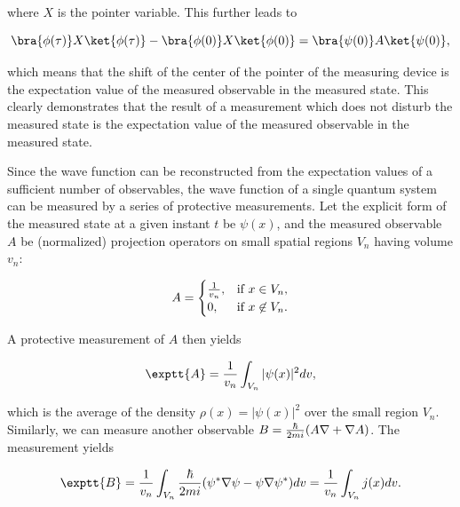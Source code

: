 \noindent where $X$ is the pointer variable. This further leads to

\begin{equation}
\bra{\phi(\tau)}X\ket{\phi(\tau)}- \bra{\phi(0)}X\ket{\phi(0)}= \bra{\psi(0)}A\ket{\psi(0)},
\end{equation}

\noindent which means that the shift of the center of the pointer of the measuring device is the expectation value of the measured observable in the measured state. This clearly demonstrates  that the result of a measurement which does not disturb the measured state is the expectation value of the measured observable in the measured state.

Since the wave function can be reconstructed from the expectation values of a sufficient number of observables, the wave function of a single quantum system can be measured by a series of protective measurements. Let the explicit form of the measured state at a given instant $t$ be $\psi(x)$, and the measured observable $A$ be (normalized) projection operators on small spatial regions $V_n$ having volume $v_n$:

\begin{equation}
A= 
\begin{cases} 
{1\over{v_n}},& \text{if $x \in V_n$,}
\\
0,&\text{if $x \not\in V_n$.} 
\end{cases}
\label{OA}
\end{equation}

\noindent  A protective measurement of $A$ then yields 

\begin{equation}
\exptt{A} = {1\over {v_n}} \int_{V_n}|\psi(x)|^2 dv,
\end{equation}

\noindent  which is the average of the density $\rho(x) = |\psi(x)|^2$ over the small region $V_n$. Similarly, we can measure another observable $B ={\hbar \over{2mi}} (A\nabla + \nabla A)$. The measurement yields

\begin{equation}
\exptt{B} ={1\over {v_n}} \int_{V_n}{\hbar \over{2mi}}(\psi^* \nabla \psi - \psi  \nabla \psi^* )dv = {1\over {v_n}} \int_{V_n}j(x)dv.
\end{equation}

